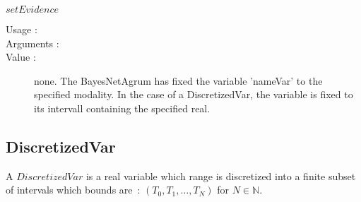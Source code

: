 \begin{description}
\begin{description}
  \item $setEvidence$
    \begin{description}
    \item[Usage :]  \strut
    \item[Arguments :]  \strut
    \item[Value :]  none. The BayesNetAgrum has fixed the variable 'nameVar' to the specified modality. In the case of a DiscretizedVar, the variable is fixed to its intervall containing the specified real.
    \end{description}

  \end{description}


\end{description}







\newpage \subsection{DiscretizedVar}

A  $DiscretizedVar$ is  a real variable which range is discretized into a finite subset of intervals which bounds are~: $(T_0,T_1, \hdots, T_N)$ for $N \in \mathbb{N}$. 

